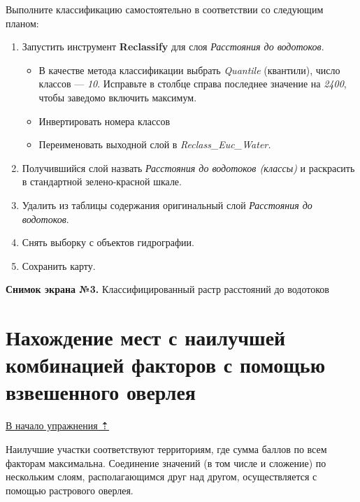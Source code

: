 \documentclass[12pt,]{book}
\begin{document}
Выполните классификацию самостоятельно в соответствии со следующим планом:

\begin{enumerate}
\def\labelenumi{\arabic{enumi}.}
\item
  Запустить инструмент \textbf{Reclassify} для слоя \emph{Расстояния до водотоков}.

  \begin{itemize}
  \item
    В качестве метода классификации выбрать \emph{Quantile} (квантили), число классов --- \emph{10}. Исправьте в столбце справа последнее значение на \emph{2400}, чтобы заведомо включить максимум.
  \item
    Инвертировать номера классов
  \item
    Переименовать выходной слой в \emph{Reclass\_Euc\_Water.}
  \end{itemize}
\item
  Получившийся слой назвать \emph{Расстояния до водотоков (классы)} и раскрасить в стандартной зелено-красной шкале.
\item
  Удалить из таблицы содержания оригинальный слой \emph{Расстояния до водотоков}.
\item
  Снять выборку с объектов гидрографии.
\item
  Сохранить карту.
\end{enumerate}

\textbf{Снимок экрана №3.} Классифицированный растр расстояний до водотоков

\hypertarget{weighted-overlay-combination}{%
\section{Нахождение мест с наилучшей комбинацией факторов с помощью взвешенного оверлея}\label{weighted-overlay-combination}}

\protect\hyperlink{weighted-overlay}{В начало упражнения ⇡}

Наилучшие участки соответствуют территориям, где сумма баллов по всем факторам максимальна. Соединение значений (в том числе и сложение) по нескольким слоям, располагающимся друг над другом, осуществляется с помощью растрового оверлея.
\end{document}

